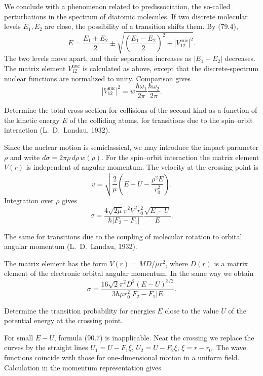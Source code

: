 We conclude with a phenomenon related to predissociation, the so-called perturbations in the spectrum of diatomic molecules. If two discrete molecular levels $E_1,E_2$ are close, the possibility of a transition shifts them. By (79.4),
\begin{equation}E=\frac{E_1+E_2}{2}\pm\sqrt{\left(\frac{E_1-E_2}{2}\right)^2+|V_{12}^{\text{nuc}}|^2}.\tag{90.20}\end{equation}
The two levels move apart, and their separation increases as $|E_1-E_2|$ decreases. The matrix element $V_{12}^{\text{nuc}}$ is calculated as above, except that the discrete-spectrum nuclear functions are normalized to unity. Comparison gives
\begin{equation}|V_{12}^{\text{nuc}}|^2=w\frac{\hbar\omega_1}{2\pi}\frac{\hbar\omega_2}{2\pi}.\tag{90.21}\end{equation}

\ProblemHeading[1] Determine the total cross section for collisions of the second kind as a function of the kinetic energy $E$ of the colliding atoms, for transitions due to the spin--orbit interaction (L.~D.~Landau, 1932).

\SolutionHeading Since the nuclear motion is semiclassical, we may introduce the impact parameter $\rho$ and write $d\sigma=2\pi\rho\,d\rho\,w(\rho)$. For the spin--orbit interaction the matrix element $V(r)$ is independent of angular momentum. The velocity at the crossing point is
\[
v=\sqrt{\frac2\mu\left(E-U-\frac{\rho^2E}{r_0^2}\right)}.
\]
Integration over $\rho$ gives
\[
\sigma=\frac{4\sqrt{2\mu}\pi^2V^2r_0^2}{\hbar|F_2-F_1|}\frac{\sqrt{E-U}}{E}.
\]

\ProblemHeading[2] The same for transitions due to the coupling of molecular rotation to orbital angular momentum (L.~D.~Landau, 1932).

\SolutionHeading The matrix element has the form $V(r)=MD/\mu r^2$, where $D(r)$ is a matrix element of the electronic orbital angular momentum. In the same way we obtain
\[
\sigma=\frac{16\sqrt2\pi^2D^2(E-U)^{3/2}}{3\hbar\mu r_0^2|F_2-F_1|E}.
\]

\ProblemHeading[3] Determine the transition probability for energies $E$ close to the value $U$ of the potential energy at the crossing point.

\SolutionHeading For small $E-U$, formula (90.7) is inapplicable. Near the crossing we replace the curves by the straight lines $U_1=U-F_1\xi$, $U_2=U-F_2\xi$, $\xi=r-r_0$. The wave functions coincide with those for one-dimensional motion in a uniform field. Calculation in the momentum representation gives

